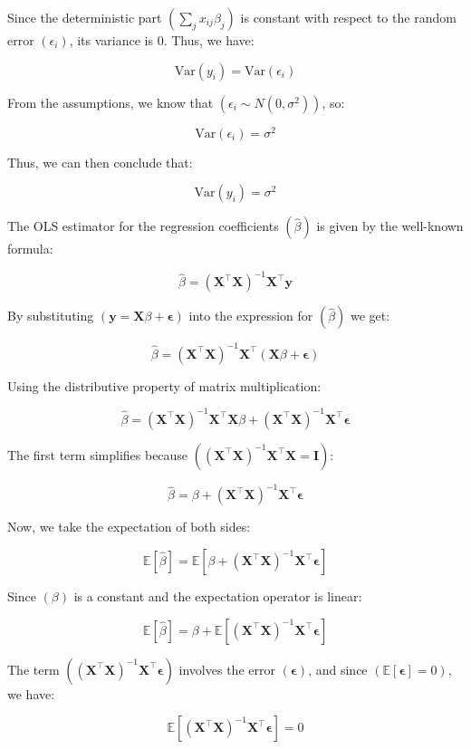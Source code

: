 Since the deterministic part $( \sum_j x_{ij} \beta_j )$ is constant with respect to the random error $( \epsilon_i )$, its variance is 0. Thus, we have:

$$\text{Var}(y_i) = \text{Var}(\epsilon_i)$$

From the assumptions, we know that $(\epsilon_i \sim N(0, \sigma^2))$, so:

$$\text{Var}(\epsilon_i) = \sigma^2$$

Thus, we can then conclude that:

$$\text{Var}(y_i) = \sigma^2$$

The OLS estimator for the regression coefficients $( \hat{\beta} )$ is given by the well-known formula:

$$\hat{\beta} = (\mathbf{X}^\top \mathbf{X})^{-1} \mathbf{X}^\top \mathbf{y}$$


By substituting $( \mathbf{y} = \mathbf{X} \beta + \boldsymbol{\epsilon} )$ into the expression for $( \hat{\beta} )$ we get:

$$\hat{\beta} = (\mathbf{X}^\top \mathbf{X})^{-1} \mathbf{X}^\top (\mathbf{X} \beta + \boldsymbol{\epsilon})$$

Using the distributive property of matrix multiplication:

$$\hat{\beta} = (\mathbf{X}^\top \mathbf{X})^{-1} \mathbf{X}^\top \mathbf{X} \beta + (\mathbf{X}^\top \mathbf{X})^{-1} \mathbf{X}^\top \boldsymbol{\epsilon}$$

The first term simplifies because $( (\mathbf{X}^\top \mathbf{X})^{-1} \mathbf{X}^\top \mathbf{X} = \mathbf{I} )$:

$$\hat{\beta} = \beta + (\mathbf{X}^\top \mathbf{X})^{-1} \mathbf{X}^\top \boldsymbol{\epsilon}$$

Now, we take the expectation of both sides:

$$\mathbb{E}[\hat{\beta}] = \mathbb{E}[\beta + (\mathbf{X}^\top \mathbf{X})^{-1} \mathbf{X}^\top \boldsymbol{\epsilon}]$$

Since $( \beta )$ is a constant and the expectation operator is linear:

$$\mathbb{E}[\hat{\beta}] = \beta + \mathbb{E}[(\mathbf{X}^\top \mathbf{X})^{-1} \mathbf{X}^\top \boldsymbol{\epsilon}]$$

The term $( (\mathbf{X}^\top \mathbf{X})^{-1} \mathbf{X}^\top \boldsymbol{\epsilon} )$ involves the error $( \boldsymbol{\epsilon} )$, and since $( \mathbb{E}[\boldsymbol{\epsilon}] = 0 )$, we have:

$$\mathbb{E}[(\mathbf{X}^\top \mathbf{X})^{-1} \mathbf{X}^\top \boldsymbol{\epsilon}] = 0$$

